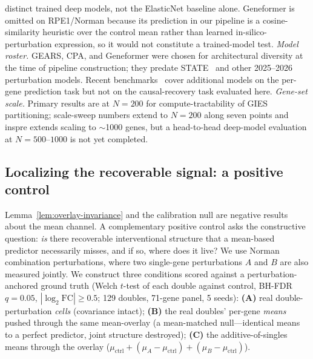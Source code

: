 \documentclass{article}
\theoremstyle{plain}
\theoremstyle{definition}
\theoremstyle{remark}
\begin{document}
distinct trained deep models, not the ElasticNet baseline alone. Geneformer is omitted on RPE1/Norman because its prediction in our pipeline is a cosine-similarity heuristic over the control mean rather than learned in-silico-perturbation expression, so it would not constitute a trained-model test. \textit{Model roster.} GEARS, CPA, and Geneformer were chosen for architectural diversity at the time of pipeline construction; they predate STATE~\citep{adduri2025state,arc2025state} and other 2025--2026 perturbation models. Recent benchmarks~\citep{wong2025simple,csendes2025benchmark,wei2025benchmark,vinas2025systema} cover additional models on the per-gene prediction task but not on the causal-recovery task evaluated here. \textit{Gene-set scale.} Primary results are at $N=200$ for compute-tractability of GIES partitioning; scale-sweep numbers extend to $N=200$ along seven points and inspre extends scaling to $\sim$1000 genes, but a head-to-head deep-model evaluation at $N=500$--$1000$ is not yet completed.

\subsection{Localizing the recoverable signal: a positive control}
\label{sec:a3-localization}
Lemma~\ref{lem:overlay-invariance} and the calibration null are negative results about the mean channel. A complementary positive control asks the constructive question: \emph{is} there recoverable interventional structure that a mean-based predictor necessarily misses, and if so, where does it live? We use Norman combination perturbations, where two single-gene perturbations $A$ and $B$ are also measured jointly. We construct three conditions scored against a perturbation-anchored ground truth (Welch $t$-test of each double against control, BH-FDR $q=0.05$, $|\log_2\mathrm{FC}|\geq 0.5$; 129 doubles, 71-gene panel, 5 seeds): \textbf{(A)} real double-perturbation \emph{cells} (covariance intact); \textbf{(B)} the real doubles' per-gene \emph{means} pushed through the same mean-overlay (a mean-matched null---identical means to a perfect predictor, joint structure destroyed); \textbf{(C)} the additive-of-singles means through the overlay ($\mu_{\text{ctrl}}+(\mu_A-\mu_{\text{ctrl}})+(\mu_B-\mu_{\text{ctrl}})$).
\end{document}
